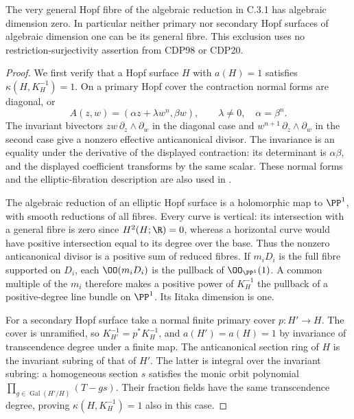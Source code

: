 \begin{proposition}
\label{st:C.3.8}
The very general Hopf fibre of the algebraic reduction in C.3.1
has algebraic dimension zero. In particular neither primary nor
secondary Hopf surfaces of algebraic dimension one can be its
general fibre. This exclusion uses no restriction-surjectivity
assertion from CDP98 or CDP20.
\end{proposition}
\begin{proof}
We first verify that a Hopf surface $H$ with $a(H)=1$ satisfies
$\kappa(H,K_H^{-1})=1$. On a primary Hopf cover the contraction
normal forms are diagonal, or
\[
A(z,w)=(\alpha z+\lambda w^n,\beta w),\qquad
\lambda\ne0,\quad \alpha=\beta^n.
\]
The invariant bivectors $zw\,\partial_z\wedge\partial_w$ in the
diagonal case and $w^{n+1}\,\partial_z\wedge\partial_w$ in the
second case give a nonzero effective anticanonical divisor.
The invariance is an equality under the derivative of the
displayed contraction: its determinant is $\alpha\beta$, and
the displayed coefficient transforms by the same scalar.
These normal forms and the elliptic-fibration description are
also used in \cite[Proposition~3.1 and its proof]{SS2002}.

The algebraic reduction of an elliptic Hopf surface is a
holomorphic map to $\PP^1$, with smooth reductions of all fibres.
Every curve is vertical: its intersection with a general fibre
is zero since $H^2(H;\R)=0$, whereas a horizontal curve would
have positive intersection equal to its degree over the base.
Thus the nonzero anticanonical divisor is a positive sum of
reduced fibres. If $m_iD_i$ is the full fibre supported on
$D_i$, each $\OO(m_iD_i)$ is the pullback of $\OO_{\PP^1}(1)$.
A common multiple of the $m_i$ therefore makes a positive power
of $K_H^{-1}$ the pullback of a positive-degree line bundle on
$\PP^1$. Its Iitaka dimension is one.

For a secondary Hopf surface take a normal finite primary cover
$p:H'\to H$. The cover is unramified, so
$K_{H'}^{-1}=p^*K_H^{-1}$, and $a(H')=a(H)=1$ by invariance of
transcendence degree under a finite map. The anticanonical
section ring of $H$ is the invariant subring of that of $H'$.
The latter is integral over the invariant subring: a homogeneous
section $s$ satisfies the monic orbit polynomial
$\prod_{g\in\operatorname{Gal}(H'/H)}(T-gs)$. Their fraction
fields have the same transcendence degree, proving
$\kappa(H,K_H^{-1})=1$ also in this case.


\end{proof}
